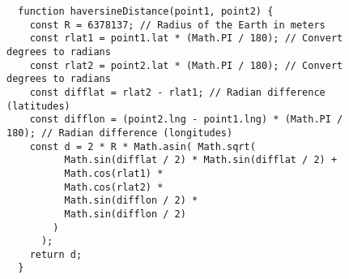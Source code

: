 \label{apendix:script-haversine}
\begin{figure}[H]
  \begin{verbatim}
  function haversineDistance(point1, point2) {
    const R = 6378137; // Radius of the Earth in meters
    const rlat1 = point1.lat * (Math.PI / 180); // Convert degrees to radians
    const rlat2 = point2.lat * (Math.PI / 180); // Convert degrees to radians
    const difflat = rlat2 - rlat1; // Radian difference (latitudes)
    const difflon = (point2.lng - point1.lng) * (Math.PI / 180); // Radian difference (longitudes)
    const d = 2 * R * Math.asin( Math.sqrt(
          Math.sin(difflat / 2) * Math.sin(difflat / 2) +
          Math.cos(rlat1) *
          Math.cos(rlat2) *
          Math.sin(difflon / 2) *
          Math.sin(difflon / 2)
        )
      );
    return d;
  }
  \end{verbatim}
\end{figure}